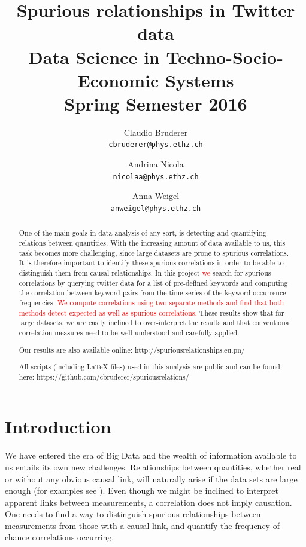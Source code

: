 \documentclass[12pt, a4paper]{article}
\author{
	Claudio Bruderer\\
	\texttt{cbruderer@phys.ethz.ch}
	\and
	Andrina Nicola\\
	\texttt{nicolaa@phys.ethz.ch}
	\and
	Anna Weigel\\
	\texttt{anweigel@phys.ethz.ch}
}
\title{Spurious relationships in Twitter data\\
	 	 \large Data Science in Techno-Socio-Economic Systems\\
	 	 \large Spring Semester 2016}
\begin{document}
\date{}
\maketitle

\begin{abstract}

One of the main goals in data analysis of any sort, is detecting and quantifying relations between quantities. With the increasing amount of data available to us, this task becomes more challenging, since large datasets are prone to spurious correlations. It is therefore important to identify these spurious correlations in order to be able to distinguish them from causal relationships. In this project \textcolor{red}{we} search for spurious correlations by querying twitter data for a list of pre-defined keywords and computing the correlation between keyword pairs from the time series of the keyword occurrence frequencies. \textcolor{red}{We compute correlations using two separate methods and find that both methods detect expected as well as spurious correlations.} These results show that for large datasets, we are easily inclined to over-interpret the results and that conventional correlation measures need to be well understood and carefully applied. 

\noindent Our results are also available online: http://spuriousrelationships.eu.pn/

\noindent All scripts (including \LaTeX$ $ files) used in this analysis are public and can be found here: https://github.com/cbruderer/spuriousrelations/

\end{abstract}


\vspace{0.2in}

\section{Introduction}
We have entered the era of Big Data and the wealth of information available to us entails its own new challenges. Relationships between quantities, whether real or without any obvious causal link, will naturally arise if the data sets are large enough (for examples see \cite{tyler_vigen}). Even though we might be inclined to interpret apparent links between measurements, a correlation does not imply causation. One needs to find a way to distinguish spurious relationships between measurements from those with a causal link, and quantify the frequency of chance correlations occurring.
\end{document}
